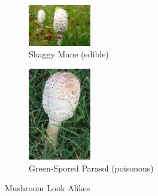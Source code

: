 \documentclass[journal]{IEEEtran}
\begin{document}
\begin{figure}[ht]
\medskip

\begin{subfigure}[b]{0.45\textwidth}
\includegraphics[width=0.3\textwidth]{imgs/shaggy_mane(double_edible_3).jpg}
\caption{Shaggy Mane (edible)}
\end{subfigure}
\hfill
\begin{subfigure}[b]{0.45\textwidth}
\includegraphics[width=0.3\textwidth]{imgs/green_spored_parasol(double_poisonous_3).jpg}
\caption{Green-Spored Parasol (poisonous)}
\end{subfigure}
\caption{Mushroom Look Alikes}
\label{fig:mushrooms}
\end{figure}


 




% 
\end{document}
